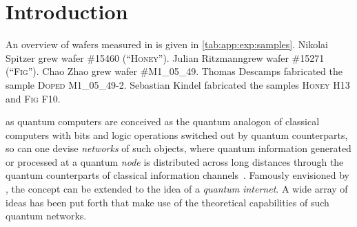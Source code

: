 \chapter{Introduction}\label{ch:exp:introduction}
\begin{partcontribs}
    An overview of wafers measured in \thispart is given in \cref{tab:app:exp:samples}.
    Nikolai Spitzer grew wafer \textsc{\#15460 (\enquote{Honey})}.
    Julian Ritzmann\sidenotemark[a] grew wafer \textsc{\#15271 (\enquote{Fig})}.
    Chao Zhao grew wafer \textsc{\#M1\_05\_49}.
    Thomas Descamps fabricated the sample \textsc{Doped M1\_05\_49-2}.
    Sebastian Kindel fabricated the samples \textsc{Honey H13} and \textsc{Fig F10}.
\end{partcontribs}

 as quantum computers are conceived as the quantum analogon of classical computers with bits and logic operations switched out by quantum counterparts, so can one devise \emph{networks} of such objects, where quantum information generated or processed at a quantum \emph{node} is distributed across long distances through the quantum counterparts of classical information channels~\cite{Nielsen2011,Simon2017}.
Famously envisioned by \citet{Kimble2008}, the concept can be extended to the idea of a \emph{quantum internet}.
A wide array of ideas has been put forth that make use of the theoretical capabilities of such quantum networks.


